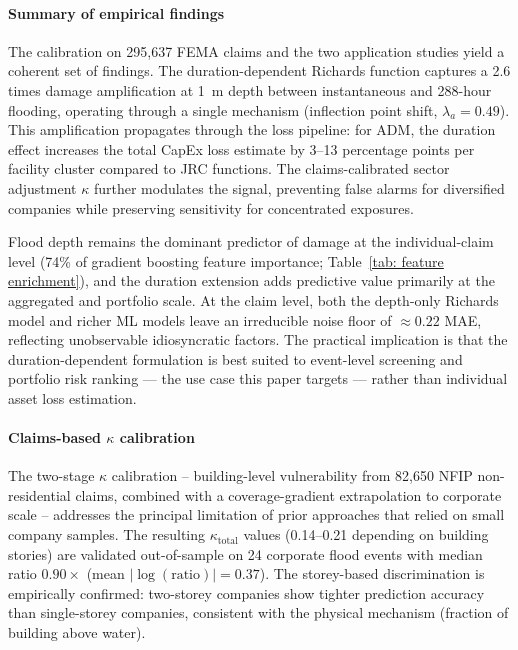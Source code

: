 \paragraph{Summary of empirical findings}
The calibration on 295{,}637 FEMA claims and the two application studies yield a coherent set of findings. The duration-dependent Richards function captures a 2.6 times damage amplification at 1~m depth between instantaneous and 288-hour flooding, operating through a single mechanism (inflection point shift, $\lambda_a = 0.49$). This amplification propagates through the loss pipeline: for ADM, the duration effect increases the total CapEx loss estimate by 3--13 percentage points per facility cluster compared to JRC functions. The claims-calibrated sector adjustment $\kappa$ further modulates the signal, preventing false alarms for diversified companies while preserving sensitivity for concentrated exposures.

Flood depth remains the dominant predictor of damage at the individual-claim level (74\% of gradient boosting feature importance; Table~\ref{tab: feature enrichment}), and the duration extension adds predictive value primarily at the aggregated and portfolio scale. At the claim level, both the depth-only Richards model and richer ML models leave an irreducible noise floor of $\approx 0.22$ MAE, reflecting unobservable idiosyncratic factors. The practical implication is that the duration-dependent formulation is best suited to event-level screening and portfolio risk ranking --- the use case this paper targets --- rather than individual asset loss estimation.

\paragraph{Claims-based $\kappa$ calibration}
The two-stage $\kappa$ calibration -- building-level vulnerability from 82{,}650 NFIP non-residential claims, combined with a coverage-gradient extrapolation to corporate scale -- addresses the principal limitation of prior approaches that relied on small company samples. The resulting $\kappa_{\text{total}}$ values (0.14--0.21 depending on building stories) are validated out-of-sample on 24 corporate flood events with median ratio $0.90\times$ (mean $|\!\log(\text{ratio})| = 0.37$). The storey-based discrimination is empirically confirmed: two-storey companies show tighter prediction accuracy than single-storey companies, consistent with the physical mechanism (fraction of building above water).

